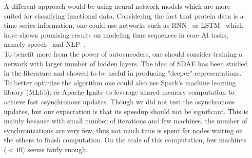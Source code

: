 \documentclass{article}
\begin{document}
A different approach would be using neural network models which are more suited for classifying functional data. Considering the fact that protein data is a time series information, one could use networks such as RNN~\cite{lang1990time} or LSTM~\cite{hochreiter1997long} which have shown promising results on modeling time sequences in core AI tasks, namely speech~\cite{graves2013speech} and NLP~\cite{mikolov2010recurrent}.\\

To benefit more from the power of autoencoders, one should consider training a network with larger number of hidden layers. The idea of SDAE has been studied in the literature and showed to be useful in producing "deeper" representations.\\

To better optimize the algorithm one could also use Spark's machine learning library (MLlib), or Apache Ignite to leverage shared memory computation to achieve fast asynchronous updates. Though we did not test the asynchronous updates, but our expectation is that its speedup should not be significant. This is mainly because with small number of iterations and few machines, the number of synchronizations are very few, thus not much time is spent for nodes waiting on the others to finish computation. On the scale of this computation, few machines ($<10$) seems fairly enough.



\end{document}
